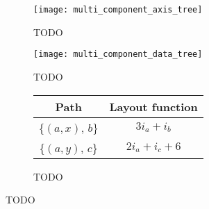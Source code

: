 \documentclass[thesis]{subfiles}
\begin{document}
\begin{figure}
  \centering
  \begin{subfigure}{.3\textwidth}
    \centering
    \texttt{[image: multi\_component\_axis\_tree]}
    \caption{TODO}
    \label{fig:multi_component_axis_tree}
  \end{subfigure}
  \begin{subfigure}{.5\textwidth}
    \centering
    \texttt{[image: multi\_component\_data\_tree]}
    \caption{TODO}
    \label{fig:multi_component_data_tree}
  \end{subfigure}

  \vspace{1em}

  \begin{subfigure}{\textwidth}
    \centering
    \begin{tabular}{c|c}
      \textbf{Path} & \textbf{Layout function} \\
      \hline
      \{$(a, x)$, $b$\} & $3 i_a + i_b$ \\
      \{$(a, y)$, $c$\} & $2 i_a + i_c + 6$ \\
    \end{tabular}
    \caption{TODO}
    \label{fig:multi_component_layouts}
  \end{subfigure}
  \caption{TODO}
  \label{fig:multi_component_axis_tree_all}
\end{figure}
\end{document}
